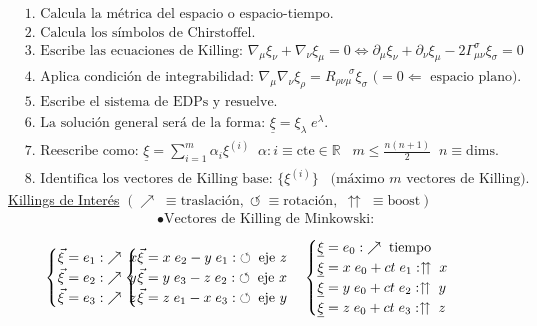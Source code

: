 \begin{align*}
    &1. \text{ Calcula la métrica del espacio o espacio-tiempo.}\\
&2. \text{ Calcula los símbolos de Chirstoffel.}\\
&3. \text{ Escribe las ecuaciones de Killing: } \nabla_\mu \xi_\nu \!+\! \nabla_\nu  \xi_\mu\!=\!0\Leftrightarrow \partial_\mu\xi_\nu \!+\! \partial_\nu \xi_\mu \!-\!2\Gamma ^\sigma_{\mu \nu }\xi_\sigma\!=\!0\\
&4. \text{ Aplica condición de integrabilidad: } \nabla_\mu \nabla_\nu \xi_\rho = R_{\rho \nu \mu }^{\; \; \; \; \;\sigma}\xi_\sigma \text{ ($=0\Leftarrow$ espacio plano).}\\
&5. \text{ Escribe el sistema de EDPs y resuelve.}\\
&6. \text{ La solución general será de la forma: }\underline{\xi}=\xi_\lambda \; e^\lambda.\\
&7. \text{ Reescribe como: }\underline{\xi} = \sum_{i=1}^m \alpha_i \xi^{(i)}\; \; \alpha:i \!\equiv \!\text{cte} \in \mathbb{R}\; \;\; m\leq \frac{n(n+1)}{2} \;\; n\!\equiv\! \text{dims.} \\
&8. \text{ Identifica los vectores de Killing base: } \{\xi^{(i)}\} \; \; \; \text{(máximo $m$ vectores de Killing).}
\end{align*}
\underline{Killings de Interés} \; $(\nearrow\;  \equiv \text{traslación},\; \circlearrowleft \;\equiv \text{rotación},\;\upuparrows\;\equiv\text{boost})$
\begin{align*}
    &\bullet \text{Vectores de Killing de Minkowski:}
    \end{align*}
\vspace{-10pt}
    \begin{align*}
        &\begin{cases} 
\vec{\xi}=e_1:\; \nearrow \; x\\
\vec{\xi}=e_2:\; \nearrow \; y\\
\vec{\xi}=e_3:\; \nearrow \; z
\end{cases}
\hspace{-30pt}
&\begin{cases} 
\vec{\xi}=x\;e_2-y\;e_1:\; \circlearrowleft \; \text{eje }z\\
\vec{\xi}=y\;e_3-z\;e_2:\; \circlearrowleft \; \text{eje }x\\
\vec{\xi}=z\;e_1-x\;e_3:\; \circlearrowleft \; \text{eje }y
\end{cases}
&\begin{cases} 
\underline{\xi}=e_0: \; \nearrow \; \text{tiempo}\\
\underline{\xi}=x\;e_0+ct\;e_1: \upuparrows \; x\\
\underline{\xi}=y\;e_0+ct\;e_2: \upuparrows \; y\\
\underline{\xi}=z\;e_0+ct\;e_3: \upuparrows \; z
\end{cases}
\end{align*}
